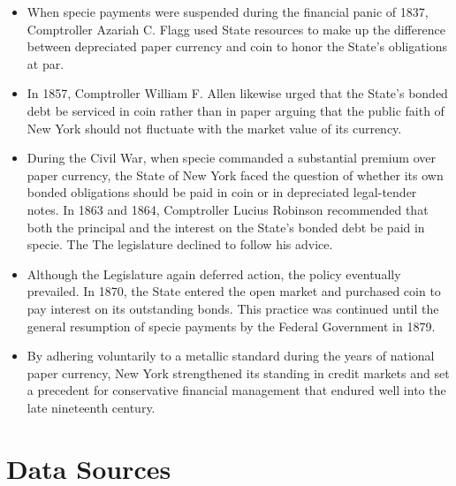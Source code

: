 \documentclass[11pt]{article}
\begin{document}
\begin{itemize}

\item When specie payments 
were suspended during the financial panic of 1837, Comptroller Azariah C. 
Flagg used State resources to make up the difference between depreciated 
paper currency and coin to honor the State’s obligations at par.  

\item In 1857, Comptroller William F. Allen likewise urged that the State’s bonded debt be 
serviced in coin rather than in paper arguing that the 
public faith of New York should not fluctuate with the market value of its 
currency.

\item During the Civil War, when specie commanded a substantial premium over paper 
currency, the State of New York faced the question of whether its own bonded 
obligations should be paid in coin or in depreciated legal-tender notes.  In 
1863 and 1864, Comptroller Lucius Robinson recommended that both the 
principal and the interest on the State’s bonded debt be paid in specie.  The 
The legislature declined to follow his advice.

\item Although the Legislature again deferred action, the policy eventually 
prevailed.  In 1870, the State entered the open market and purchased coin to 
pay interest on its outstanding bonds.  This practice was continued until the 
general resumption of specie payments by the Federal Government in 1879.  

\item By adhering voluntarily to a metallic standard during the years of national paper 
currency, New York strengthened its standing in credit markets and set a 
precedent for conservative financial management that endured well into the 
late nineteenth century.

\end{itemize}

\section{Data Sources}
\end{document}
